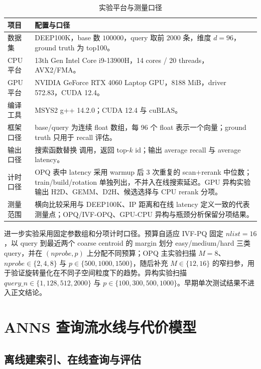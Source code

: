 \documentclass[a4paper,11pt,UTF8]{ctexart}
\newcommand{\code}[1]{\texttt{\detokenize{#1}}}
\begin{document}
\begin{table}[H]
  \centering\footnotesize
  \begin{tabularx}{\textwidth}{p{3.0cm}Y}
    \toprule
    项目 & 配置与口径 \\
    \midrule
    数据集 & DEEP100K，base 数 $100000$，query 取前 $2000$ 条，维度 $d=96$，ground truth 为 top100。\\
    CPU 平台 & 13th Gen Intel Core i9-13900H，14 cores / 20 threads，AVX2/FMA。\\
    GPU 平台 & NVIDIA GeForce RTX 4060 Laptop GPU，8188 MiB，driver 572.83，CUDA 12.4。\\
    编译工具 & MSYS2 g++ 14.2.0；CUDA 12.4 与 cuBLAS。\\
    框架口径 & base/query 为连续 float 数组，每 96 个 float 表示一个向量；ground truth 只用于 recall 评估。\\
    输出口径 & 搜索函数替换 \code{flat_search} 调用，返回 top-$k$ id；输出 average recall 与 average latency。\\
    计时口径 & OPQ 表中 latency 采用 warmup 后 3 次重复的 scan+rerank 中位数；train/build/rotation 单独列出，不并入在线搜索延迟。GPU 异构实验输出 H2D、GEMM、D2H、候选选择与 CPU rerank 分项。\\
    测量范围 & 横向比较采用与 DEEP100K、IP 距离和在线 latency 定义一致的代表测量点；OPQ/IVF-OPQ、GPU-CPU 异构与瓶颈分析保留分项结果。\\
    \bottomrule
  \end{tabularx}
  \caption{实验平台与测量口径}
  \label{tab:env}
\end{table}

进一步实验采用固定参数组和分项计时口径。预算自适应 IVF-PQ 固定 $nlist=16$，以 query 到最近两个 coarse centroid 的 margin 划分 easy/medium/hard 三类 query，并在 $(nprobe,p)$ 上分配不同预算；OPQ 主实验扫描 $M=8$、$nprobe\in\{2,4,8\}$ 与 $p\in\{500,1000,1500\}$，随后补充 $M\in\{12,16\}$ 的窄扫参，用于验证旋转量化在不同子空间粒度下的趋势。异构实验扫描 $query\_n\in\{1,128,512,2000\}$ 与 $p\in\{100,300,500,1000\}$。早期单次测试结果不进入正文结论。

\section{ANNS 查询流水线与代价模型}

\subsection{离线建索引、在线查询与评估}
\end{document}
